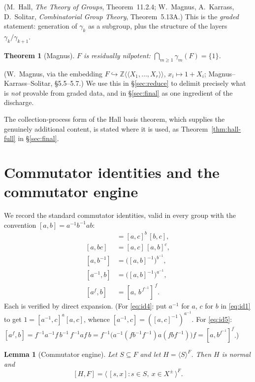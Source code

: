 \documentclass{amsart}
\newtheorem{theorem}{Theorem}
\newtheorem{lemma}{Lemma}
\theoremstyle{definition}
\theoremstyle{remark}
\begin{document}
\noindent
(M.\ Hall, \emph{The Theory of Groups}, Theorem~11.2.4; W.\ Magnus, A.\ Karrass,
D.\ Solitar, \emph{Combinatorial Group Theory}, Theorem~5.13A.) This is the
\emph{graded} statement: generation of $\gamma_k$ as a subgroup, plus the
structure of the layers $\gamma_k/\gamma_{k+1}$.

\begin{theorem}[Magnus]\label{thm:magnus}
$F$ is residually nilpotent: $\bigcap_{m\ge1}\gamma_m(F)=\{1\}$.
\end{theorem}

\noindent
(W.\ Magnus, via the embedding $F\hookrightarrow\mathbb Z\langle\!\langle
X_1,\dots,X_r\rangle\!\rangle$, $x_i\mapsto 1+X_i$; Magnus--Karrass--Solitar,
\S5.5--5.7.) We use this in \S\ref{sec:reduce} to delimit precisely what is
\emph{not} provable from graded data, and in \S\ref{sec:final} as one ingredient
of the discharge.

\noindent
The collection-process form of the Hall basis theorem, which supplies the
genuinely additional content, is stated where it is used, as
Theorem~\ref{thm:hall-full} in \S\ref{sec:final}.

\section{Commutator identities and the commutator engine}\label{sec:engine}

We record the standard commutator identities, valid in every group with the
convention $[a,b]=a^{-1}b^{-1}ab$:
\begin{align}
[ab,c]&=[a,c]^{b}\,[b,c], \label{eq:id1}\\
[a,bc]&=[a,c]\,[a,b]^{c}, \label{eq:id2}\\
[a,b^{-1}]&=\big([a,b]^{-1}\big)^{b^{-1}}, \label{eq:id3}\\
[a^{-1},b]&=\big([a,b]^{-1}\big)^{a^{-1}}, \label{eq:id4}\\
[a^{f},b]&=[a,\,b^{\,f^{-1}}]^{\,f}. \label{eq:id5}
\end{align}
Each is verified by direct expansion. (For \eqref{eq:id4}: put $a^{-1}$ for $a$,
$c$ for $b$ in \eqref{eq:id1} to get $1=[a^{-1},c]^{a}[a,c]$, whence
$[a^{-1},c]=([a,c]^{-1})^{a^{-1}}$. For \eqref{eq:id5}:
$[a^f,b]=f^{-1}a^{-1}f\,b^{-1}\,f^{-1}af\,b
=f^{-1}\big(a^{-1}(fb^{-1}f^{-1})a(fbf^{-1})\big)f=[a,b^{f^{-1}}]^{f}$.)

\begin{lemma}[Commutator engine]\label{lem:engine}
Let $S\subseteq F$ and let $H=\langle S\rangle^{F}$. Then $H$ is normal and
\begin{equation}\label{eq:engine}
[H,F]=\big\langle\,[s,x] : s\in S,\ x\in X^{\pm}\,\big\rangle^{F}.
\end{equation}
\end{lemma}
\end{document}
